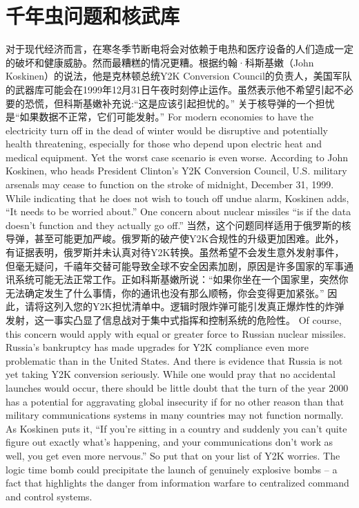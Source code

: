 \section{千年虫问题和核武库}
\begin{paracol}{2}
对于现代经济而言，在寒冬季节断电将会对依赖于电热和医疗设备的人们造成一定的破坏和健康威胁。然而最糟糕的情况更糟。根据约翰·科斯基嫩（John Koskinen）的说法，他是克林顿总统Y2K Conversion Council的负责人，美国军队的武器库可能会在1999年12月31日午夜时刻停止运作。虽然表示他不希望引起不必要的恐慌，但科斯基嫩补充说:“这是应该引起担忧的。” 关于核导弹的一个担忧是“如果数据不正常，它们可能发射。”
\switchcolumn
For modern economies to have the electricity turn off in the dead of winter would be disruptive and potentially health threatening, especially for those who depend upon electric heat and medical equipment. Yet the worst case scenario is even worse. According to John Koskinen, who heads President Clinton's Y2K Conversion Council, U.S. military arsenals may cease to function on the stroke of midnight, December 31, 1999. While indicating that he does not wish to touch off undue alarm, Koskinen adds, ``It needs to be worried about.'' One concern about nuclear missiles ``is if the data doesn't function and they actually go off.''
\switchcolumn*
当然，这个问题同样适用于俄罗斯的核导弹，甚至可能更加严峻。俄罗斯的破产使Y2K合规性的升级更加困难。此外，有证据表明，俄罗斯并未认真对待Y2K转换。虽然希望不会发生意外发射事件，但毫无疑问，千禧年交替可能导致全球不安全因素加剧，原因是许多国家的军事通讯系统可能无法正常工作。正如科斯基嫩所说：“如果你坐在一个国家里，突然你无法确定发生了什么事情，你的通讯也没有那么顺畅，你会变得更加紧张。” 因此，请将这列入您的Y2K担忧清单中。逻辑时限炸弹可能引发真正爆炸性的炸弹发射，这一事实凸显了信息战对于集中式指挥和控制系统的危险性。
\switchcolumn
Of course, this concern would apply with equal or greater force to Russian nuclear missiles. Russia's bankruptcy has made upgrades for Y2K compliance even more problematic than in the United States. And there is evidence that Russia is not yet taking Y2K conversion seriously. While one would pray that no accidental launches would occur, there should be little doubt that the turn of the year 2000 has a potential for aggravating global insecurity if for no other reason than that military communications systems in many countries may not function normally. As Koskinen puts it, ``If you're sitting in a country and suddenly you can't quite figure out exactly what's happening, and your communications don't work as well, you get even more nervous.'' So put that on your list of Y2K worries. The logic time bomb could precipitate the launch of genuinely explosive bombs -- a fact that highlights the danger from information warfare to centralized command and control systems.

\end{paracol}
